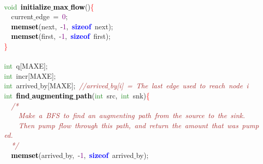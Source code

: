 {{\mbox{} \\
\mbox{}\textcolor{ForestGreen}{void}\ \textbf{\textcolor{Black}{initialize$\_$max$\_$flow}}\textcolor{BrickRed}{()}\textcolor{Red}{\{} \\
\mbox{}\ \ current$\_$edge\ \textcolor{BrickRed}{=}\ \textcolor{Purple}{0}\textcolor{BrickRed}{;} \\
\mbox{}\ \ \textbf{\textcolor{Black}{memset}}\textcolor{BrickRed}{(}next\textcolor{BrickRed}{,}\ \textcolor{BrickRed}{-}\textcolor{Purple}{1}\textcolor{BrickRed}{,}\ \textbf{\textcolor{Blue}{sizeof}}\ next\textcolor{BrickRed}{);} \\
\mbox{}\ \ \textbf{\textcolor{Black}{memset}}\textcolor{BrickRed}{(}first\textcolor{BrickRed}{,}\ \textcolor{BrickRed}{-}\textcolor{Purple}{1}\textcolor{BrickRed}{,}\ \textbf{\textcolor{Blue}{sizeof}}\ first\textcolor{BrickRed}{);} \\
\mbox{}\textcolor{Red}{\}} \\
\mbox{} \\
\mbox{}\textcolor{ForestGreen}{int}\ q\textcolor{BrickRed}{[}MAXE\textcolor{BrickRed}{];} \\
\mbox{}\textcolor{ForestGreen}{int}\ incr\textcolor{BrickRed}{[}MAXE\textcolor{BrickRed}{];} \\
\mbox{}\textcolor{ForestGreen}{int}\ arrived$\_$by\textcolor{BrickRed}{[}MAXE\textcolor{BrickRed}{];}\ \textit{\textcolor{Brown}{//arrived$\_$by[i]\ =\ The\ last\ edge\ used\ to\ reach\ node\ i}} \\
\mbox{}\textcolor{ForestGreen}{int}\ \textbf{\textcolor{Black}{find$\_$augmenting$\_$path}}\textcolor{BrickRed}{(}\textcolor{ForestGreen}{int}\ src\textcolor{BrickRed}{,}\ \textcolor{ForestGreen}{int}\ snk\textcolor{BrickRed}{)}\textcolor{Red}{\{} \\
\mbox{}\ \ \textit{\textcolor{Brown}{/*}} \\
\mbox{}\textit{\textcolor{Brown}{\ \ \ \ Make\ a\ BFS\ to\ find\ an\ augmenting\ path\ from\ the\ source\ to\ the\ sink.}} \\
\mbox{}\textit{\textcolor{Brown}{\ \ \ \ Then\ pump\ flow\ through\ this\ path,\ and\ return\ the\ amount\ that\ was\ pumped.}} \\
\mbox{}\textit{\textcolor{Brown}{\ \ */}} \\
\mbox{}\ \ \textbf{\textcolor{Black}{memset}}\textcolor{BrickRed}{(}arrived$\_$by\textcolor{BrickRed}{,}\ \textcolor{BrickRed}{-}\textcolor{Purple}{1}\textcolor{BrickRed}{,}\ \textbf{\textcolor{Blue}{sizeof}}\ arrived$\_$by\textcolor{BrickRed}{);} \\
}}
